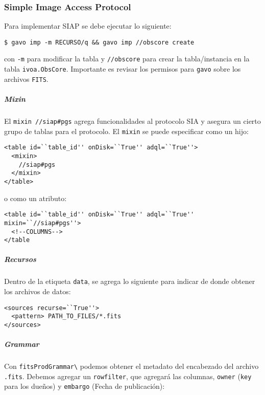 \subsubsection*{Simple Image Access Protocol}

Para implementar SIAP se debe ejecutar lo siguiente:

\begin{verbatim}
$ gavo imp -m RECURSO/q && gavo imp //obscore create
\end{verbatim}

con \verb;-m; para modificar la tabla y \verb;//obscore; para crear la tabla/instancia en la tabla \verb;ivoa.ObsCore;. Importante es revisar los permisos para \verb;gavo; sobre los archivos \verb;FITS;.

\paragraph{}
\subparagraph{Mixin}

El \verb;mixin //siap#pgs; agrega funcionalidades al protocolo SIA y asegura un cierto grupo de tablas para el protocolo. El \verb;mixin; se puede especificar como un hijo:

\begin{verbatim}
<table id=``table_id'' onDisk=``True'' adql=``True''>
  <mixin>
    //siap#pgs
  </mixin>
</table>
\end{verbatim}

\noindent o como un atributo:

\begin{verbatim}
<table id=``table_id'' onDisk=``True'' adql=``True'' mixin=``//siap#pgs''>
  <!--COLUMNS-->
</table
\end{verbatim}

\subparagraph{Recursos}

Dentro de la etiqueta \verb;data;, se agrega lo siguiente para indicar de donde obtener los archivos de datos:

\begin{verbatim}
<sources recurse=``True''>
  <pattern> PATH_TO_FILES/*.fits
</sources>
\end{verbatim}

\subparagraph{Grammar}

Con \verb;fitsProdGrammar\; podemos obtener el metadato del encabezado del archivo \verb;.fits;. Debemos agregar un \verb;rowfilter;, que agregará las columnas, \verb;owner; (\verb;key; para los dueños) y \verb;embargo; (Fecha de publicación):

